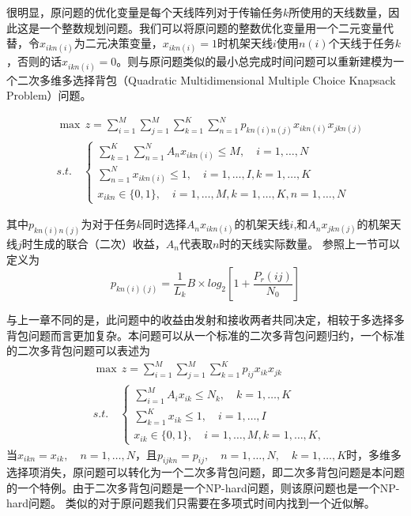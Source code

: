 很明显，原问题的优化变量是每个天线阵列对于传输任务$k$所使用的天线数量，因此这是一个整数规划问题。我们可以将原问题的整数优化变量用一个二元变量代替，令$x_{ikn(i)}$为二元决策变量，$x_{ikn(i)}=1$时机架天线$i$使用$n(i)$个天线于任务$k$，否则的话$x_{ikn(i)}=0$。则与原问题类似的最小总完成时间问题可以重新建模为一个二次多维多选择背包（Quadratic Multidimensional Multiple Choice Knapsack Problem）问题。

\begin{equation}
	\begin{split}
		&\max\, z = \sum_{i=1}^{M}\sum_{j=1}^{M}\sum_{k=1}^{K}\sum_{n=1}^{N}p_{kn(i)n(j)}x_{ikn(i)}x_{jkn(j)} \\
		&s.t.\quad  \left\{\begin{array}{l}
		\sum\limits_{k=1}^{K}\sum\limits_{n=1}^{N} A_{n}x_{ikn(i)}\leq M, \quad  i = 1,\dots,N\\
		\sum\limits_{n=1}^{N} x_{ikn(i)}\leq 1,\quad i = 1,\dots,I,k = 1,\dots,K\\
		x_{ikn}\in\{0,1\}, \quad  i=1,\dots,M, k=1,\dots,K, n = 1,\dots,N \end{array}\right.
		\end{split}
\end{equation}

其中$p_{kn(i)n(j)}$为对于任务$k$同时选择$A_n x_{ikn(i)}$的机架天线$i$,和$A_n x_{jkn(j)}$的机架天线$j$时生成的联合（二次）收益，$A_n$代表取$n$时的天线实际数量。
参照上一节可以定义为
\begin{equation}
	p_{kn(i)(j)} = \frac{1}{L_{k}} B\times log_2\left[1+\frac{P_r(ij)}{N_0}\right]
\end{equation}

与上一章不同的是，此问题中的收益由发射和接收两者共同决定，相较于多选择多背包问题而言更加复杂。本问题可以从一个标准的二次多背包问题归约，一个标准的二次多背包问题可以表述为
\begin{equation}
	\begin{split}
		&\max\, z = \sum_{i=1}^{M}\sum_{j=1}^{M}\sum_{k=1}^{K}p_{ij}x_{ik}x_{jk} \\
		&s.t.\quad  \left\{\begin{array}{l}
		\sum\limits_{i=1}^{M} A_{i}x_{ik}\leq N_k, \quad  k = 1,\dots,K\\
		\sum\limits_{k=1}^{K} x_{ik}\leq 1,\quad i = 1,\dots,I\\
		x_{ik}\in\{0,1\}, \quad  i=1,\dots,M, k=1,\dots,K,\end{array}\right.
		\end{split}
\end{equation}
当$x_{ikn} = x_{ik}, \quad n = 1,\dots,N$，且$p_{ijkn} = p_{ij},\quad n = 1,\dots,N, \quad k =1,\dots,K$时，多维多选择项消失，原问题可以转化为一个二次多背包问题，即二次多背包问题是本问题的一个特例。由于二次多背包问题是一个NP-hard问题，则该原问题也是一个NP-hard问题。
类似的对于原问题我们只需要在多项式时间内找到一个近似解。

